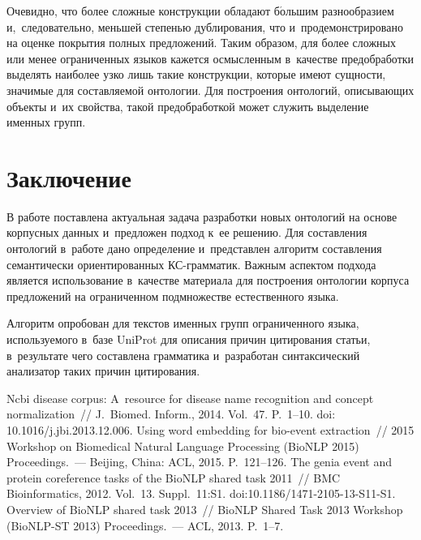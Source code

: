 \begin{multicols}{2}
 
  
  Очевидно, что более сложные конструкции обладают б$\acute{\mbox{о}}$льшим 
разнообразием и,~следовательно, меньшей степенью дублирования, что 
и~продемонстрировано на оценке покрытия полных предложений. Таким 
образом, для более сложных или менее ограниченных языков кажется 
осмысленным в~качестве предобработки выделять наиболее узко лишь такие 
конструкции, которые имеют сущности, значимые для составляемой онтологии. 
Для построения онтологий, описывающих объекты и~их свойства, такой 
предобработкой может служить выделение именных групп.

\vspace*{-6pt}
  
  \section{Заключение}
  
  В работе поставлена актуальная задача разработки новых онтологий на 
основе корпусных данных и~предложен подход к~ее решению. Для составления 
онтологий в~работе дано определение и~представлен алгоритм составления 
семантически ориентированных КС-грам\-ма\-тик. Важным аспектом подхода 
является использование в~качестве материала для построения онтологии 
корпуса предложений на ограниченном подмножестве естественного языка.
{

}
  
  Алгоритм опробован для текстов именных групп ограниченного языка, 
используемого в~базе UniProt для описания причин цитирования статьи, 
в~результате чего составлена грамматика и~разработан синтаксический 
анализатор таких причин цитирования.

\vspace*{-6pt}

{\small\frenchspacing
 {%
 \begin{thebibliography}{99}
 
 \vspace*{-2pt}
 Ncbi disease corpus: 
A~resource for 
disease name recognition and concept normalization~// J.~Biomed. Inform., 2014. 
Vol.~47. P.~1--10. doi: 10.1016/j.jbi.2013.12.006.
 Using word embedding for 
bio-event extraction~// 2015 Workshop on Biomedical Natural Language Processing 
(BioNLP 2015) Proceedings.~--- Beijing, China: ACL, 2015. P.~121--126. 
 The genia event and 
protein coreference tasks of the BioNLP shared task 2011~// BMC Bioinformatics, 2012. 
Vol.~13. Suppl.~11:S1. doi:10.1186/1471-2105-13-S11-S1.
 Overview of BioNLP shared task 2013~// BioNLP Shared Task 2013 
Workshop (BioNLP-ST 2013) Proceedings.~---  ACL, 2013. P.~1--7.


\end{thebibliography}}}
\end{multicols}
